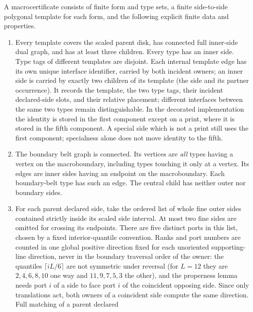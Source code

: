 \begin{definition}
\label{def:certificate}
A macrocertificate consists of finite form and type sets, a finite
side-to-side polygonal template for each form, and the following explicit
finite data and properties.
\begin{enumerate}
\item[(G1)] Every template covers the scaled parent disk, has connected
full inner-side dual graph, and has at least three children.  Every type
has an inner side.  Type tags of different templates are disjoint.
Each internal template edge has its own unique interface identifier,
carried by both incident owners; an inner side is carried by exactly two
children of its template (the side and its partner occurrence).  It records the template, the two type
tags, their incident declared-side slots, and their relative placement;
different interfaces between the same two types remain distinguishable.
In the decorated implementation the identity is
stored in the first component except on a print, where it is stored in
the fifth component.  A special side which is not a print still uses the
first component; specialness alone does not move identity to the fifth.
\item[(G2)] The boundary belt graph is connected.  Its vertices are
\emph{all} types having a vertex on the macroboundary, including types
touching it only at a vertex.  Its edges are inner sides having an endpoint
on the macroboundary.  Each boundary-belt type has such an edge.  The
central child has neither outer nor boundary sides.
\item[(G3)] For each parent declared side, take the ordered list of whole
fine outer sides contained strictly inside its scaled side interval.
At most two fine sides are omitted for crossing its endpoints.  There
are five distinct ports in this list, chosen by a fixed interior-quantile
convention.  Ranks and port numbers are counted in one global positive
direction fixed for each unoriented supporting-line direction, never in
the boundary traversal order of the owner: the quantiles
$\lceil iL/6\rceil$ are not symmetric under reversal (for $L=12$ they are
$2,4,6,8,10$ one way and $11,9,7,5,3$ the other), and the properness
lemma needs port $i$ of a side to face port $i$ of the coincident
opposing side.  Since only translations act, both owners of a coincident
side compute the same direction.  Full matching of a parent declared

\end{enumerate}
\end{definition}
